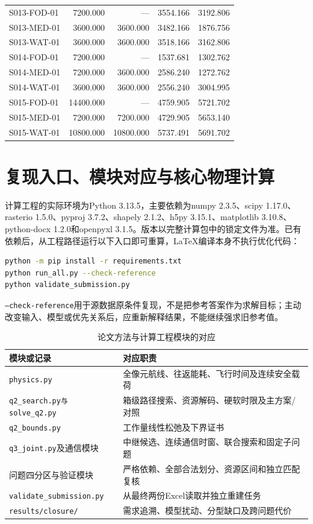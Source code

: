 \documentclass[a4paper]{my_paper}%
\numberwithin{equation}{section}
\theoremstyle{definition}
\begin{document}
\begin{longtable}{@{}lrrrr@{}}
S013-FOD-01 & 7200.000 & — & 3554.166 & 3192.806\\
S013-MED-01 & 3600.000 & 3600.000 & 3482.166 & 1876.756\\
S013-WAT-01 & 3600.000 & 3600.000 & 3518.166 & 3162.806\\
S014-FOD-01 & 7200.000 & — & 1537.681 & 1302.762\\
S014-MED-01 & 7200.000 & 3600.000 & 2586.240 & 1272.762\\
S014-WAT-01 & 3600.000 & 3600.000 & 2556.240 & 3004.995\\
S015-FOD-01 & 14400.000 & — & 4759.905 & 5721.702\\
S015-MED-01 & 7200.000 & 7200.000 & 4729.905 & 5653.140\\
S015-WAT-01 & 10800.000 & 10800.000 & 5737.491 & 5691.702\\
\end{longtable}
\endgroup


\section{复现入口、模块对应与核心物理计算}
计算工程的实际环境为Python 3.13.5，主要依赖为numpy 2.3.5、scipy 1.17.0、rasterio 1.5.0、pyproj 3.7.2、shapely 2.1.2、h5py 3.15.1、matplotlib 3.10.8、python-docx 1.2.0和openpyxl 3.1.5。版本以完整计算包中的锁定文件为准。已有依赖后，从工程路径运行以下入口即可重算，LaTeX编译本身不执行优化代码：
\begin{lstlisting}[language=bash,numbers=none]
python -m pip install -r requirements.txt
python run_all.py --check-reference
python validate_submission.py
\end{lstlisting}
\texttt{--check-reference}用于源数据原条件复现，不是把参考答案作为求解目标；主动改变输入、模型或优先关系后，应重新解释结果，不能继续强求旧参考值。

\begin{table}[htbp]\centering\small
\caption{论文方法与计算工程模块的对应}\label{tab:modules}
\begin{tabularx}{\linewidth}{@{}P{.31\linewidth}Y@{}}\toprule
模块或记录 & 对应职责\\\midrule
\texttt{physics.py} & 全像元航线、往返能耗、飞行时间及连续安全载荷\\
\texttt{q2\_search.py与solve\_q2.py} & 箱级路径搜索、资源解码、硬软时限及主方案/对照\\
\texttt{q2\_bounds.py} & 工作量线性松弛及下界证书\\
\texttt{q3\_joint.py}及通信模块 & 中继候选、连续通信时窗、联合搜索和固定子问题\\
问题四分区与验证模块 & 严格依赖、全部合法划分、资源区间和独立匹配复核\\
\texttt{validate\_submission.py} & 从最终两份Excel读取并独立重建任务\\
\texttt{results/closure/} & 需求追溯、模型扰动、分型缺口及跨问题代价\\\bottomrule
\end{tabularx}
\end{table}
\end{document}
